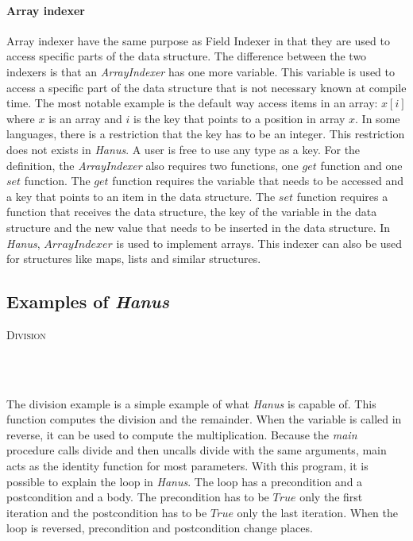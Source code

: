 \documentclass[12pt,a4paper]{article}
\newcommand{\code}[2]{
	\begin{center}
		\vspace{.5cm}
		\textsc{\small #1}\\
		\vspace{.5cm}
	\end{center}
	\begin{minipage}{.9\textwidth}
		\inputminted[frame=lines,framesep=1cm,baselinestretch=.8,linenos,fontsize=\footnotesize]
			{haskell}{code/#2.hs}
	\end{minipage}
}
\begin{document}
    \paragraph{Array indexer}   
    Array indexer have the same purpose as Field Indexer in that they are used to access specific parts of the data structure. The difference between the two indexers is that an \textit{ArrayIndexer} has one more variable. This variable is used to access a specific part of the data structure that is not necessary known at compile time. The most notable example is the default way access items in an array: $x[i]$ where $x$ is an array and $i$ is the key that points to a position in array $x$. In some languages, there is a restriction that the key has to be an integer. This restriction does not exists in \textit{Hanus}. A user is free to use any type as a key. For the definition, the \textit{ArrayIndexer} also requires two functions, one $get$ function and one $set$ function. The $get$ function requires the variable that needs to be accessed and a key that points to an item in the data structure. The $set$ function requires a function that receives the data structure, the key of the variable in the data structure and the new value that needs to be inserted in the data structure. In \textit{Hanus}, $ArrayIndexer$ is used to implement arrays. This indexer can also be used for structures like maps, lists and similar structures.   
    
\subsection{Examples of \textit{Hanus}} 
    
\code{Division}{divide} \\\\
The division example is a simple example of what \textit{Hanus} is capable of. This function computes the division and the remainder. When the variable is called in reverse, it can be used to compute the multiplication. Because the \textit{main} procedure calls divide and then uncalls divide with the same arguments, main acts as the identity function for most parameters. With this program, it is possible to explain the loop in \textit{Hanus}. The loop has a precondition and a postcondition and a body. The precondition has to be $True$ only the first iteration and the postcondition has to be $True$ only the last iteration. When the loop is reversed, precondition and postcondition change places. 
    
\end{document}
